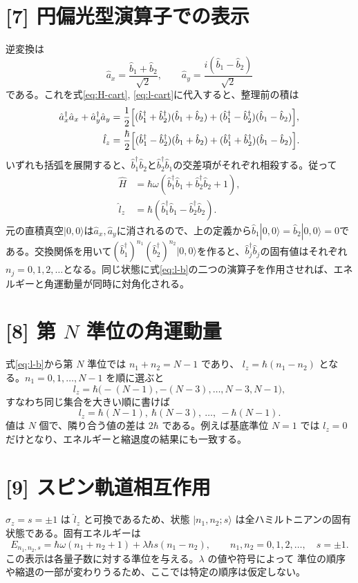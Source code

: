 \documentclass[11pt,a4paper]{article}
\begin{document}
\section*{[7] 円偏光型演算子での表示}
逆変換は
\[
 \hat a_x=\frac{\hat b_1+\hat b_2}{\sqrt2},
 \qquad
 \hat a_y=\frac{i(\hat b_1-\hat b_2)}{\sqrt2}
\]
である。これを式\eqref{eq:H-cart}, \eqref{eq:l-cart}に代入すると、整理前の積は
\begin{align}
 \hat a_x^\dagger\hat a_x+\hat a_y^\dagger\hat a_y
 &=\frac12\Bigl[(\hat b_1^\dagger+\hat b_2^\dagger)(\hat b_1+\hat b_2)
 +(\hat b_1^\dagger-\hat b_2^\dagger)(\hat b_1-\hat b_2)\Bigr],\\
 \hat l_z&=\frac{\hbar}{2}\Bigl[(\hat b_1^\dagger-\hat b_2^\dagger)(\hat b_1+\hat b_2)
 +(\hat b_1^\dagger+\hat b_2^\dagger)(\hat b_1-\hat b_2)\Bigr].
\end{align}
いずれも括弧を展開すると、$\hat b_1^\dagger\hat b_2$と$\hat b_2^\dagger\hat b_1$の交差項がそれぞれ相殺する。従って
\begin{align}
 \hat H&=\hbar\omega(\hat b_1^\dagger\hat b_1+
                      \hat b_2^\dagger\hat b_2+1),\\
 \hat l_z&=\hbar(\hat b_1^\dagger\hat b_1-
                      \hat b_2^\dagger\hat b_2).
 \label{eq:l-b}
\end{align}
元の直積真空$|0,0\rangle$は$\hat a_x,\hat a_y$に消されるので、上の定義から$\hat b_1|0,0\rangle=\hat b_2|0,0\rangle=0$である。交換関係を用いて$(\hat b_1^\dagger)^{n_1}(\hat b_2^\dagger)^{n_2}|0,0\rangle$を作ると、$\hat b_j^\dagger\hat b_j$の固有値はそれぞれ$n_j=0,1,2,\ldots$となる。同じ状態に式\eqref{eq:l-b}の二つの演算子を作用させれば、エネルギーと角運動量が同時に対角化される。

\section*{[8] 第 $N$ 準位の角運動量}
式\eqref{eq:l-b}から第 $N$ 準位では $n_1+n_2=N-1$ であり、
$l_z=\hbar(n_1-n_2)$ となる。$n_1=0,1,\ldots,N-1$ を順に選ぶと
\begin{equation}
 l_z=\hbar\bigl(-(N-1),-(N-3),\ldots,N-3,N-1\bigr),
\end{equation}
すなわち同じ集合を大きい順に書けば
\begin{equation}
 \boxed{l_z=\hbar(N-1),\ \hbar(N-3),\ \ldots,\ -\hbar(N-1)}.
\end{equation}
値は $N$ 個で、隣り合う値の差は $2\hbar$ である。例えば基底準位 $N=1$
では $l_z=0$ だけとなり、エネルギーと縮退度の結果にも一致する。

\section*{[9] スピン軌道相互作用}
$\sigma_z=s=\pm1$ は $\hat l_z$ と可換であるため、状態
$|n_1,n_2;s\rangle$ は全ハミルトニアンの固有状態である。固有エネルギーは
\begin{equation}
 \boxed{E_{n_1,n_2,s}=\hbar\omega(n_1+n_2+1)
       +\lambda\hbar s(n_1-n_2)},
 \qquad n_1,n_2=0,1,2,\ldots,\quad s=\pm1.
\end{equation}
この表示は各量子数に対する準位を与える。$\lambda$ の値や符号によって
準位の順序や縮退の一部が変わりうるため、ここでは特定の順序は仮定しない。
\end{document}
